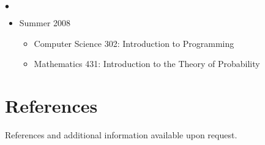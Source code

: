 \documentclass[margin,line,10pt]{res}
\newenvironment{list2}{
  \begin{list}{$\bullet$}{%
      \setlength{\itemsep}{0in}
      \setlength{\parsep}{0in} \setlength{\parskip}{0in}
      \setlength{\topsep}{0in} \setlength{\partopsep}{0in} 
      \setlength{\leftmargin}{0.2in}}}{\end{list}}
\begin{document}
\begin{resume}
\begin{list2}
\begin{itemize}
\item Summer 2008
\begin{itemize}
\item Computer Science 302: Introduction to Programming
\item Mathematics 431: Introduction to the Theory of Probability
\end{itemize}

  \end{itemize}

 
  
\end{list2}




\vspace{0.5cm}
\section{\sc References}
References and additional information available upon request. 

\begin{comment}
\begin{tabular}{ll}
[1] & {\bf \underline{Daniel Gianola}}, Ph.D. Sewall Wright Professor of Animal Breeding and Genetics. \\
    & Department of Animal Sciences, University of Wisconsin-Madison. \\ 
    & Address: 1675 Observatory Dr. Madison, WI 53706-1284.  \\
    & E-mail: gianola -at- ansci.wisc.edu, Phone: 608-265-2054
\end{tabular}
\end{comment}



\end{resume}
\end{document}
